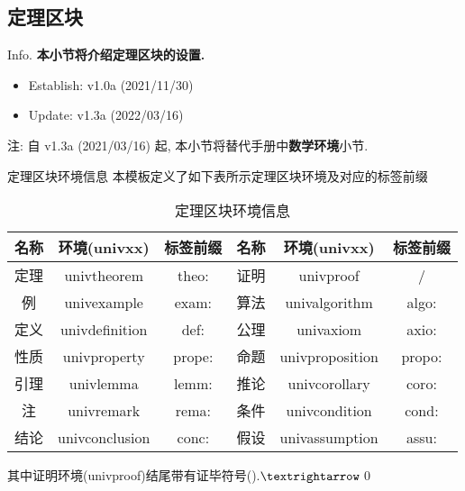 \documentclass[hyperref, UTF8, CJK, aspectratio=169]{beamer}
\begin{document}
\subsection{定理区块}
\begin{frame}{Info.}
	\textbf{本小节将介绍定理区块的设置.}
	\begin{multicols}{2}
		\begin{itemize}
			\item Establish: \textcolor{univgreen}{v1.0a (2021/11/30)}
			\item Update: \textcolor{univgreen}{v1.3a (2022/03/16)}
		\end{itemize}
	\end{multicols}
	注: 自 \textcolor{univgreen}{v1.3a (2021/03/16)} 起, 本小节将替代手册中\alert{\textbf{数学环境}}小节.\par
	\mycopyright
\end{frame}

\begin{frame}{定理区块环境信息}
	本模板定义了如下表所示定理区块环境及对应的标签前缀
	\begin{table}[htbp!]
		\centering
		\caption{定理区块环境信息}
		\label{tab:ShuxueHjdy}
		\begin{tabular}{ccc|ccc}
			\toprule
			名称 &          环境(univxx)        &  标签前缀  & 名称 &          环境(univxx)         &  标签前缀  \\ \midrule
			定理 &  \color{univred}univtheorem   &  theo:     & 证明 &    \color{univred}univproof    &   /     \\
			例   &  \color{univred}univexample   &  exam:     & 算法 &  \color{univred}univalgorithm  &  algo:  \\
			定义 & \color{univred}univdefinition &  def:      & 公理 &    \color{univred}univaxiom    &  axio:  \\
			性质 &  \color{univred}univproperty  &  prope:    & 命题 & \color{univred}univproposition &  propo: \\
			引理 &   \color{univred}univlemma    &  lemm:     & 推论 &  \color{univred}univcorollary  &  coro:  \\
			注   &   \color{univred}univremark   &  rema:     & 条件 &  \color{univred}univcondition  &  cond:  \\
			结论 & \color{univred}univconclusion &  conc:     & 假设 & \color{univred}univassumption  &  assu:  \\ \bottomrule
		\end{tabular}
	\end{table}
	其中证明环境(univproof)结尾带有证毕符号().$\textrightarrow$\qed
\end{frame}
	
\end{document}
